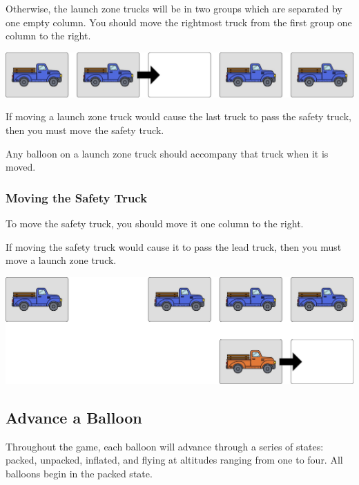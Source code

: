 \documentclass[a6paper, 11pt, parskip=half, DIV=15]{scrartcl}
\begin{document}

Otherwise, the launch zone trucks will be in two groups which are separated by one empty column. You should move the rightmost truck from the first group one column to the right.

\begin{center}
\includegraphics[scale=0.1]{wind_diagram_2.jpg}
\end{center}

If moving a launch zone truck would cause the last truck to pass the safety truck, then you must move the safety truck.

Any balloon on a launch zone truck should accompany that truck when it is moved.

\newpage
\enlargethispage{1.75\baselineskip}
\subsubsection*{Moving the Safety Truck}
To move the safety truck, you should move it one column to the right.

If moving the safety truck would cause it to pass the lead truck, then you must move a launch zone truck.

\begin{center}
\includegraphics[scale=0.1]{wind_diagram_3.jpg}
\end{center}

\subsection*{Advance a Balloon}
Throughout the game, each balloon will advance through a series of states: packed, unpacked, inflated, and flying at altitudes ranging from one to four. All balloons begin in the packed state.
\end{document}
